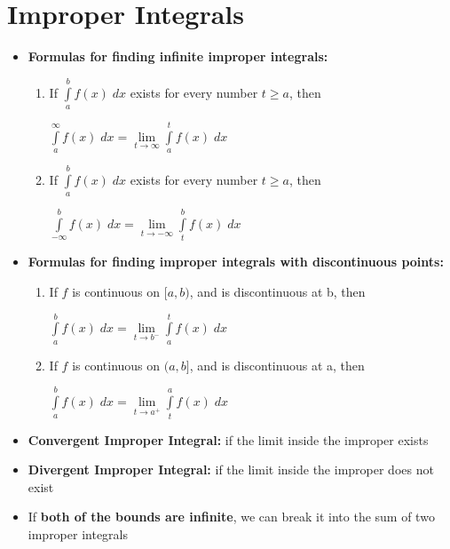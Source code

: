 \documentclass{report}
\begin{document}
	\section{Improper Integrals}
		\begin{itemize}\addtolength{\leftskip}{2em}
			\item \textbf{Formulas for finding infinite improper integrals:}
			\begin{enumerate}\addtolength{\leftskip}{4em}
				\item If $\int\limits_{a}^{b}f(x)\;dx$ exists for every number $t\ge a$, then
				\begin{center}
					\large$\int\limits_{a}^{\infty}f(x)\;dx=\lim\limits_{t\rightarrow \infty}\int\limits_{a}^{t}f(x)\;dx$
				\end{center}
				\item If $\int\limits_{a}^{b}f(x)\;dx$ exists for every number $t\ge a$, then
				\begin{center}
					\large$\int\limits_{-\infty}^{b}f(x)\;dx=\lim\limits_{t\rightarrow -\infty}\int\limits_{t}^{b}f(x)\;dx$
				\end{center}
			\end{enumerate}
			\item \textbf{Formulas for finding improper integrals with discontinuous points:}
			\begin{enumerate}\addtolength{\leftskip}{4em}
				\item If $f$ is continuous on $[a,b)$, and is discontinuous at b, then
				\begin{center}
					\large$\int\limits_{a}^{b}f(x)\;dx=\lim\limits_{t\rightarrow b^-}\int\limits_{a}^{t}f(x)\;dx$
				\end{center}
				\item If $f$ is continuous on $(a,b]$, and is discontinuous at a, then
				\begin{center}
				\large	$\int\limits_{a}^{b}f(x)\;dx=\lim\limits_{t\rightarrow a^+}\int\limits_{t}^{a}f(x)\;dx$
				\end{center}
				
			\end{enumerate}
			\item \textbf{Convergent Improper Integral:} if the limit inside the improper exists
			\item \textbf{Divergent Improper Integral:} if the limit inside the improper does not exist	
			\item If \textbf{both of the bounds are infinite}, we can break it into the sum of two improper integrals
			
		\end{itemize}
\end{document}
